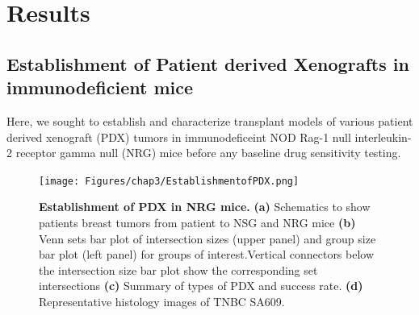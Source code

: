 \section{Results}

\subsection{Establishment of Patient derived Xenografts in immunodeficient mice}

Here, we sought to establish and characterize transplant models of various patient derived xenograft (PDX) tumors in immunodeficeint NOD Rag-1 null interleukin-2 receptor gamma null (NRG) mice before any baseline drug sensitivity testing.

\begin{figure}
	\centering
	\texttt{[image: Figures/chap3/EstablishmentofPDX.png]}
	\caption[Establishment of PDX in NRG mice]
	{\small
	    \textbf{Establishment of PDX in NRG mice.}
	    \textbf{(a)} Schematics to show patients breast tumors from patient to NSG and NRG mice 
	    \textbf{(b)} Venn sets bar plot of intersection sizes (upper panel) and group size bar plot  (left panel) for groups of interest.Vertical connectors below the intersection size
bar plot show the corresponding set intersections
	    \textbf{(c)} Summary of types of PDX and success rate.
	     \textbf{(d)} Representative histology images of TNBC SA609. 
	}
	\label{fig:EstablishmentofPDX}
\end{figure}

